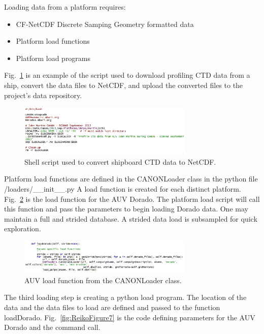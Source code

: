 Loading data from a platform requires:

\begin{itemize}
\item CF-NetCDF Discrete Samping Geometry formatted data
\item Platform load functions
\item Platform load programs
\end{itemize}

Fig.~\ref{fig:ReikoFigure5} is an example of the script used to download profiling CTD data from a ship, convert the data files to NetCDF, and upload the converted files to the project’s data repository.

\begin{figure}[htbp]
\centering
\includegraphics[width=3.3in]{ReikoFigure5.png}
\caption{Shell script used to convert shipboard CTD data to NetCDF.}
\label{fig:ReikoFigure5}
\end{figure}

Platform load functions are defined in the CANONLoader class in the python file /loaders/\_\_init\_\_.py   A load function is created for each distinct platform.  Fig.~\ref{fig:ReikoFigure6} is the load function for the AUV Dorado.  The platform load script will call this function and pass the parameters to begin loading Dorado data.  One may maintain a full and strided database.  A strided data load is subsampled for quick exploration.

\begin{figure}[htbp]
\centering
\includegraphics[width=3.3in]{ReikoFigure6.png}
\caption{AUV load function from the CANONLoader class.}
\label{fig:ReikoFigure6}
\end{figure}

The third loading step is creating a python load program.  The location of the data and the data files to load are defined and passed to the function loadDorado.  Fig.~\ref{fig:ReikoFigure7} is the code defining parameters for the AUV Dorado and the command call.

